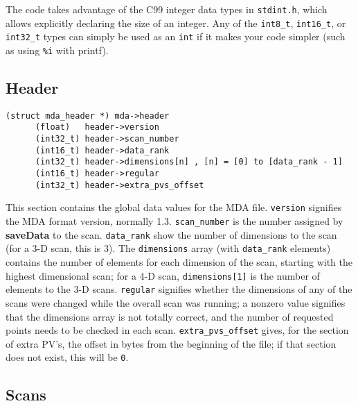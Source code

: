 \documentclass[10pt,letterpaper]{article}
\begin{document}
The code takes advantage of the C99 integer data types in
\verb+stdint.h+, which allows explicitly declaring the size of an
integer.  Any of the \verb+int8_t+, \verb+int16_t+, or \verb+int32_t+
types can simply be used as an \verb+int+ if it makes your code
simpler (such as using \verb+%i+ with printf).


\subsection{Header}
\label{header}
\begin{verbatim}
(struct mda_header *) mda->header
      (float)   header->version
      (int32_t) header->scan_number
      (int16_t) header->data_rank
      (int32_t) header->dimensions[n] , [n] = [0] to [data_rank - 1]
      (int16_t) header->regular
      (int32_t) header->extra_pvs_offset
\end{verbatim}

This section contains the global data values for the MDA file.
\verb+version+ signifies the MDA format version, normally 1.3.
\verb+scan_number+ is the number assigned by \textbf{saveData} to the
scan.  \verb+data_rank+ show the number of dimensions to the scan (for
a 3-D scan, this is 3).  The \verb+dimensions+ array (with
\verb+data_rank+ elements) contains the number of elements for each
dimension of the scan, starting with the highest dimensional scan; for
a 4-D scan, \verb+dimensions[1]+ is the number of elements to the 3-D
scans.  \verb+regular+ signifies whether the dimensions of any of the
scans were changed while the overall scan was running; a nonzero value
signifies that the dimensions array is not totally correct, and the
number of requested points needs to be checked in each
scan. \verb+extra_pvs_offset+ gives, for the section of extra PV's,
the offset in bytes from the beginning of the file; if that section
does not exist, this will be \verb+0+.


\subsection{Scans}
\end{document}
